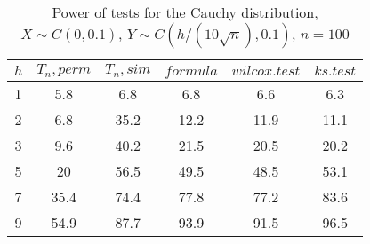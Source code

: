 \documentclass{svproc}
\begin{document}
\begin{table}
  \caption{Power of tests for the Cauchy distribution, $X\sim C(0,0.1)$, $Y\sim C(h/(10\sqrt{n}),0.1)$, $n=100$}
  \begin{center}
  \begin{tabular}{c@{\quad}c@{\quad}c@{\quad}c@{\quad}c@{\quad}c}
  \hline
  $h$ & $T_n, perm$ & $T_n, sim$ & $formula$ & $wilcox.test$ & $ks.test$ \\
  \hline
  1 & 5.8 & 6.8 & 6.8 & 6.6 & 6.3 \\
  2 & 6.8 & 35.2 & 12.2 & 11.9 & 11.1 \\
  3 & 9.6 & 40.2 & 21.5 & 20.5 & 20.2 \\
  5 & 20 & 56.5 & 49.5 & 48.5 & 53.1 \\
  7 & 35.4 & 74.4 & 77.8 & 77.2 & 83.6 \\
  9 & 54.9 & 87.7 & 93.9 & 91.5 & 96.5 \\
  \hline
  \end{tabular}
  \end{center}
\end{table}
\end{document}
